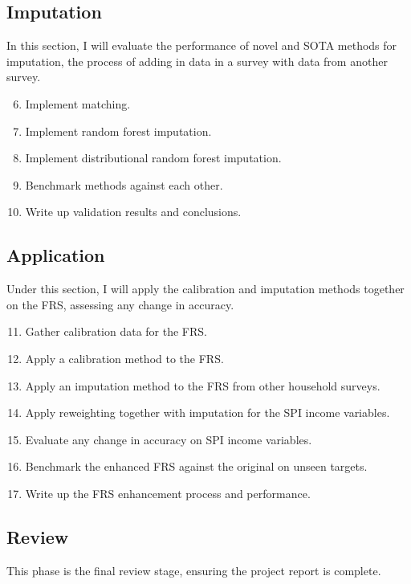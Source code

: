 \documentclass[twocolumn]{article}
\begin{document}
\subsection{Imputation}

In this section, I will evaluate the performance of novel and SOTA methods for imputation, the process of adding in data in a survey with data from another survey.

\begin{enumerate}
    \setcounter{enumi}{5}
    \item Implement matching.
    \item Implement random forest imputation.
    \item Implement distributional random forest imputation.
    \item Benchmark methods against each other.
    \item Write up validation results and conclusions.
\end{enumerate}

\subsection{Application}

Under this section, I will apply the calibration and imputation methods together on the FRS, assessing any change in accuracy.

\begin{enumerate}
    \setcounter{enumi}{10}
    \item Gather calibration data for the FRS.
    \item Apply a calibration method to the FRS.
    \item Apply an imputation method to the FRS from other household surveys.
    \item Apply reweighting together with imputation for the SPI income variables.
    \item Evaluate any change in accuracy on SPI income variables.
    \item Benchmark the enhanced FRS against the original on unseen targets.
    \item Write up the FRS enhancement process and performance.
\end{enumerate}

\subsection{Review}

This phase is the final review stage, ensuring the project report is complete.
\end{document}
